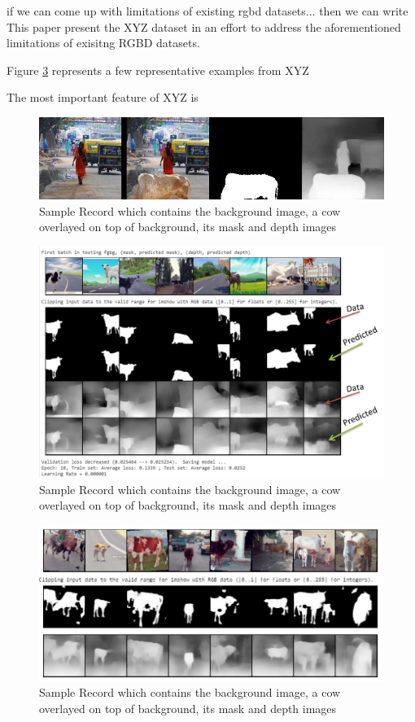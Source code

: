 \documentclass{article}
\begin{document}
if we can come up with limitations of existing rgbd datasets... then we can write This paper present the XYZ dataset in an effort to address the aforementioned limitations of exisitng RGBD datasets.

Figure \ref{fig:samplerecord} represents a few representative examples from XYZ

The most important feature of XYZ is 

\begin{figure}[h!]
\centering
  \includegraphics[width=1\textwidth]{samplerecord.png}
  \caption{Sample Record which contains the background image, a cow overlayed on top of background, its mask and depth images}
  \label{fig:samplerecord}
\end{figure}


\begin{figure}[h!]
\centering
  \includegraphics[width=1\textwidth]{finalepoch.png}
  \caption{Sample Record which contains the background image, a cow overlayed on top of background, its mask and depth images}
  \label{fig:samplerecord}
\end{figure}


\begin{figure}[h!]
\centering
  \includegraphics[width=1\textwidth]{unseen.jpeg}
  \caption{Sample Record which contains the background image, a cow overlayed on top of background, its mask and depth images}
  \label{fig:samplerecord}
\end{figure}
\end{document}
